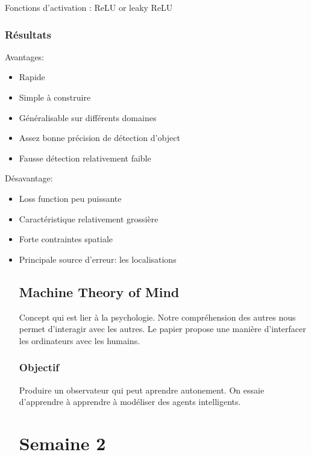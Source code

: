 \documentclass[oneside]{book}
\begin{document}
Fonctions d'activation : ReLU or leaky ReLU\\

\subsection{Résultats}
Avantages:
\begin{itemize}
\item Rapide
\item Simple à construire
\item Généralisable sur différents domaines
\item Assez bonne précision de détection d'object
\item Fausse détection relativement faible
\end{itemize}

Désavantage:
\begin{itemize}
\item Loss function peu puissante
\item Caractéristique relativement grossière
\item Forte contraintes spatiale
\item Principale source d'erreur: les localisations


\section{Machine Theory of Mind}
Concept qui est lier à la psychologie. Notre compréhension des autres nous permet d'interagir avec les autres. Le papier propose une manière d'interfacer les ordinateurs avec les humains.

\subsection{Objectif}
Produire un observateur qui peut aprendre autonement. On essaie d'apprendre à apprendre à modéliser des agents intelligents.\\


\chapter{Semaine 2}
\end{itemize}
\end{document}
